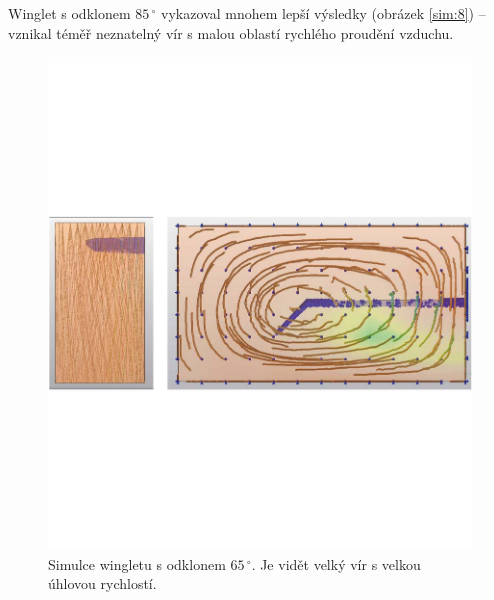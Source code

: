 Winglet s odklonem $85\,^{\circ}$ vykazoval mnohem lepší výsledky (obrázek \ref{sim:8}) – vznikal téměř neznatelný vír s malou oblastí rychlého proudění vzduchu.

\begin{figure}[H]
	\centering
	\includegraphics[]{obrazky/simulace/simulace7p}
	\caption{Simulce wingletu s odklonem $65\,^{\circ}$. Je vidět velký vír s velkou úhlovou rychlostí.}
	\label{sim:7}
\end{figure}

